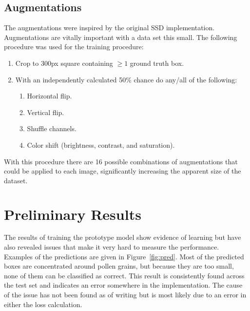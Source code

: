 \subsection*{Augmentations}
The augmentations were inspired by the original SSD implementation.
Augmentations are vitally important with a data set this small.
The following procedure was used for the training procedure:
\begin{enumerate}
  \item Crop to 300px square containing \( \geq 1 \) ground truth box.
  \item With an independently calculated 50\% chance do any/all of the following:
  \begin{enumerate}
  \item Horizontal flip.
  \item Vertical flip.
  \item Shuffle channels.
  \item Color shift (brightness, contrast, and saturation).
  \end{enumerate}
\end{enumerate}

With this procedure there are 16 possible combinations of augmentations that could be applied to each image, significantly increasing the apparent size of the dataset.

\section*{Preliminary Results}
The results of training the prototype model show evidence of learning but have also revealed issues that make it very hard to measure the performance.
Examples of the predictions are given in Figure~\ref{fig:pred}.
Most of the predicted boxes are concentrated around pollen grains, but because they are too small, none of them can be classified as correct.
This result is consistently found across the test set and indicates an error somewhere in the implementation.
The cause of the issue has not been found as of writing but is most likely due to an error in either the loss calculation.

